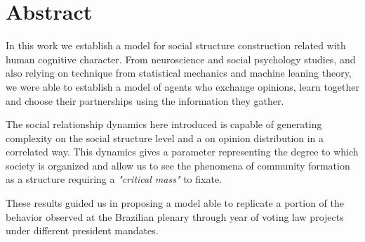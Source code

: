 
\chapter{Abstract}
\label{ch:abstract}

In this work we establish a model for social structure construction related with human cognitive character.
From neuroscience and social psychology studies, and also relying on technique from statistical mechanics and machine leaning theory, we were able to establish a model of agents who exchange opinions, learn together and choose their partnerships using the information they gather.

The social relationship dynamics here introduced is capable of generating complexity on the social structure level and a on opinion distribution in a correlated way.
This dynamics gives a parameter representing the degree to which society is organized and allow us to see the phenomena of community formation as a structure requiring a \emph{"critical mass"} to fixate.

These results guided us in proposing a model able to replicate a portion of the behavior observed at the Brazilian plenary through year of voting law projects under different president mandates.
